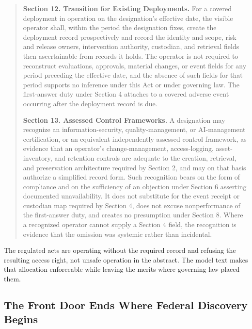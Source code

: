 \begin{quote}
\textbf{Section 12. Transition for Existing Deployments.} For a covered deployment in operation on the designation's effective date, the visible operator shall, within the period the designation fixes, create the deployment record prospectively and record the identity and scope, risk and release owners, intervention authority, custodian, and retrieval fields then ascertainable from records it holds. The operator is not required to reconstruct evaluations, approvals, material changes, or event fields for any period preceding the effective date, and the absence of such fields for that period supports no inference under this Act or under governing law. The first-answer duty under Section 4 attaches to a covered adverse event occurring after the deployment record is due.

\textbf{Section 13. Assessed Control Frameworks.} A designation may recognize an information-security, quality-management, or AI-management certification, or an equivalent independently assessed control framework, as evidence that an operator's change-management, access-logging, asset-inventory, and retention controls are adequate to the creation, retrieval, and preservation architecture required by Section 2, and may on that basis authorize a simplified record form. Such recognition bears on the form of compliance and on the sufficiency of an objection under Section 6 asserting documented unavailability. It does not substitute for the event receipt or custodian map required by Section 4, does not excuse nonperformance of the first-answer duty, and creates no presumption under Section 8. Where a recognized operator cannot supply a Section 4 field, the recognition is evidence that the omission was systemic rather than incidental.
\end{quote}

The regulated acts are operating without the required record and refusing the resulting access right, not unsafe operation in the abstract. The model text makes that allocation enforceable while leaving the merits where governing law placed them.

\subsection{The Front Door Ends Where Federal Discovery Begins}
\label{sec:erie}

